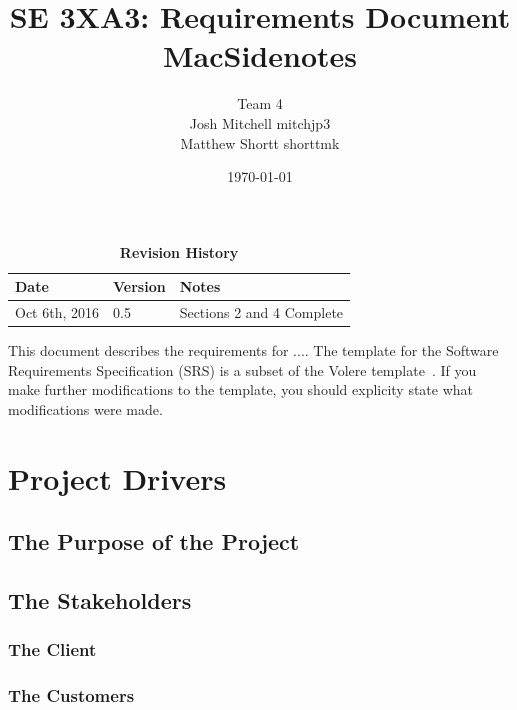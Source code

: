 \documentclass[12pt, titlepage]{article}
\title{SE 3XA3: Requirements Document\\MacSidenotes}
\author{Team 4
		\\ Josh Mitchell mitchjp3
		\\ Matthew Shortt shorttmk
}
\date{\today}
\begin{document}
\maketitle

\tableofcontents
\listoftables
\listoffigures



\begin{table}[bp]
\caption{\bf Revision History}
\begin{tabularx}{\textwidth}{p{3cm}p{2cm}X}
\toprule {\bf Date} & {\bf Version} & {\bf Notes}\\
\midrule
Oct 6th, 2016 & 0.5 & Sections 2 and 4 Complete\\
\bottomrule
\end{tabularx}
\end{table}

\newpage



This document describes the requirements for ....  The template for the Software
Requirements Specification (SRS) is a subset of the Volere
template~\citep{RobertsonAndRobertson2012}.  If you make further modifications
to the template, you should explicity state what modifications were made.

\section{Project Drivers}

\subsection{The Purpose of the Project}

\subsection{The Stakeholders}

\subsubsection{The Client}

\subsubsection{The Customers}
\end{document}
